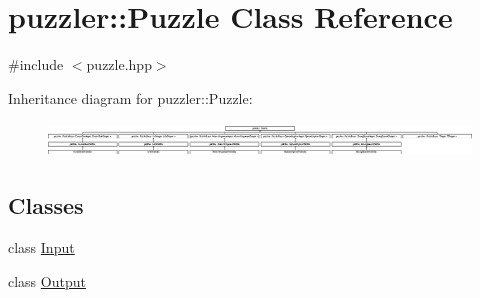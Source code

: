\hypertarget{a00026}{}\section{puzzler\+:\+:Puzzle Class Reference}
\label{a00026}


{\ttfamily \#include $<$puzzle.\+hpp$>$}

Inheritance diagram for puzzler\+:\+:Puzzle\+:\begin{figure}[H]
\begin{center}
\leavevmode
\includegraphics[height=0.926385cm]{a00026}
\end{center}
\end{figure}
\subsection*{Classes}
\begin{DoxyCompactItemize}
\item 
class \hyperlink{a00009}{Input}
\item 
class \hyperlink{a00023}{Output}
\end{DoxyCompactItemize}
